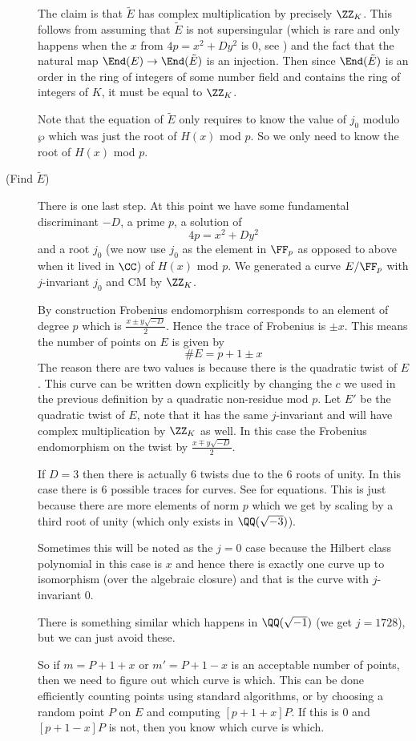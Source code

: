 \documentclass[11pt]{article}
\begin{document}
\begin{description}
	The claim is that $\tilde{E}$ has complex multiplication by precisely $\ZZ_K$. This follows from assuming that $\tilde{E}$ is not supersingular (which is rare and only happens when the $x$ from $4p = x^2 + Dy^2$ is $0$, see \cite[Ex.~5.10b]{silverman2009arithmetic}) and the fact that the natural map $\End(E) \to \End(\tilde{E})$ is an injection. Then since $\End(\tilde{E})$ is an order in the ring of integers of some number field and contains the ring of integers of $K$, it must be equal to $\ZZ_K$.
	
	Note that the equation of $\tilde{E}$ only requires to know the value of $j_0$ modulo $\wp$ which was just the root of $H(x)$ mod $p$. So we only need to know the root of $H(x)$ mod $p$.
	
	\item[(Find $\tilde{E}$)]
	
	There is one last step. At this point we have some fundamental discriminant $-D$, a prime $p$, a solution of
	$$
	4p = x^2 + Dy^2
	$$
	and a root $j_0$ (we now use $j_0$ as the element in $\FF_p$ as opposed to above when it lived in $\CC$) of $H(x)$ mod $p$. We generated a curve $E/\FF_p$ with $j$-invariant $j_0$ and CM by $\ZZ_K$.
	
	By construction Frobenius endomorphism corresponds to an element of degree $p$ which is $\frac{x \pm y\sqrt{-D}}{2}$. Hence the trace of Frobenius is $\pm x$. This means the number of points on $E$ is given by
	$$
	\#E = p + 1 \pm x
	$$
	The reason there are two values is because there is the quadratic twist of $E$. This curve can be written down explicitly by changing the $c$ we used in the previous definition by a quadratic non-residue mod $p$. Let $E'$ be the quadratic twist of $E$, note that it has the same $j$-invariant and will have complex multiplication by $\ZZ_K$ as well. In this case the Frobenius endomorphism on the twist by $\frac{x \mp y\sqrt{-D}}{2}$.
	
	\begin{warn}
		If $D = 3$ then there is actually $6$ twists due to the $6$ roots of unity. In this case there is $6$ possible traces for curves. See \cite[A.14.2.3, Pg.~151]{ieee2000standards} for equations. This is just because there are more elements of norm $p$ which we get by scaling by a third root of unity (which only exists in $\QQ(\sqrt{-3})$).
		
		Sometimes this will be noted as the $j=0$ case because the Hilbert class polynomial in this case is $x$ and hence there is exactly one curve up to isomorphism (over the algebraic closure) and that is the curve with $j$-invariant $0$.
		
		There is something similar which happens in $\QQ(\sqrt{-1})$ (we get $j=1728$), but we can just avoid these.
	\end{warn}
	
	So if $m = P + 1 + x$ or $m' = P + 1 - x$ is an acceptable number of points, then we need to figure out which curve is which. This can be done efficiently counting points using standard algorithms, or by choosing a random point $P$ on $E$ and computing $[p+1+x]P$. If this is $0$ and $[p+1-x]P$ is not, then you know which curve is which.
\end{description}
\end{document}

